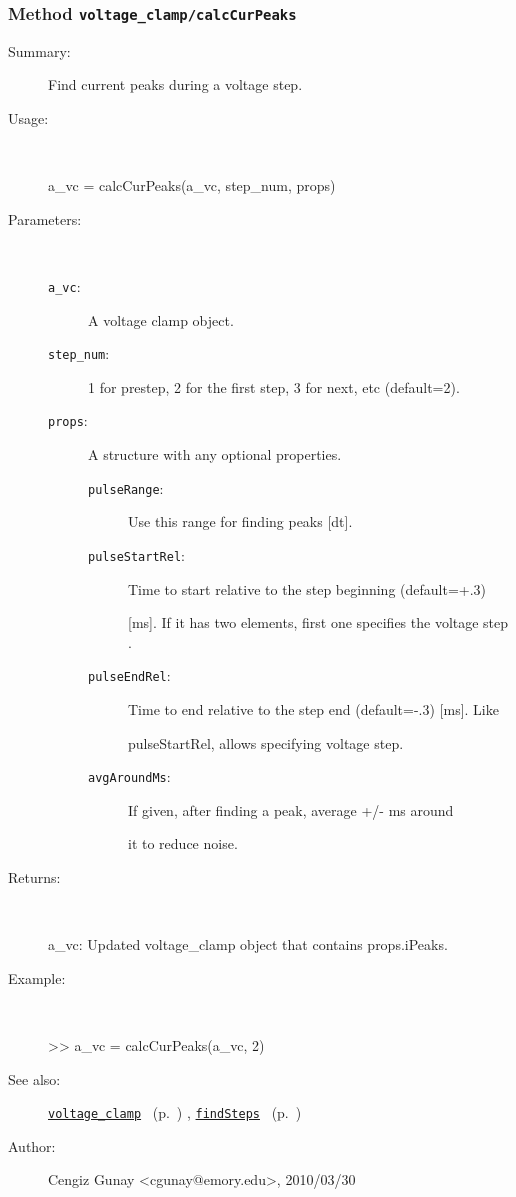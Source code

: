 \subsubsection[Method \texttt{calcCurPeaks}]{Method \texttt{voltage\_clamp/calcCurPeaks}}%
%
\label{ref_voltage_clamp__calcCurPeaks}%
\hypertarget{ref_voltage_clamp__calcCurPeaks}{}%
\begin{description}
\item[Summary:]Find current peaks during a voltage step.
%
\item[Usage:]~%
\begin{lyxcode}%
a\_vc = calcCurPeaks(a\_vc, step\_num, props)
%
\end{lyxcode}%
%
%
\item[Parameters:]~
\begin{description}%
\item[\texttt{a\_vc}:]
 A voltage clamp object.
\item[\texttt{step\_num}:]
 1 for prestep, 2 for the first step, 3 for next, etc (default=2).
\item[\texttt{props}:]
 A structure with any optional properties.
\begin{description}%
\item[\texttt{pulseRange}:]
 Use this range for finding peaks [dt].
\item[\texttt{pulseStartRel}:]
 Time to start relative to the step beginning (default=+.3)

[ms]. If it has two elements, first one  specifies the voltage step .
\item[\texttt{pulseEndRel}:]
 Time to end relative to the step end (default=-.3) [ms]. Like

pulseStartRel, allows specifying voltage step.
\item[\texttt{avgAroundMs}:]
 If given, after finding a peak, average +/- ms around

it to reduce noise.
\end{description}%
\end{description}%
%
\item[Returns:
]~

   a\_vc: Updated voltage\_clamp object that contains props.iPeaks.
%
\item[Example:]~
\begin{lyxcode} >> a\_vc = calcCurPeaks(a\_vc, 2)
\\%
\end{lyxcode}
%
\item[See also:]%
\hyperlink{ref_voltage_clamp}{\texttt{voltage\_clamp}}%
\ (p.~\pageref{ref_voltage_clamp})%
%
, \hyperlink{ref_findSteps}{\texttt{findSteps}}%
\ (p.~\pageref{ref_findSteps})%
%
%
\item[Author:]%
Cengiz Gunay <cgunay@emory.edu>, 2010/03/30
%
\end{description}
\methodline%
